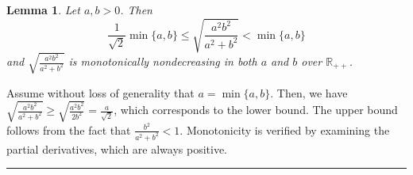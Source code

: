 \documentclass[twoside]{article}
\newcommand{\R}{\mathbb{R}}
\newcommand{\jmlrBlackBox}{\rule{1.5ex}{1.5ex}}
\newcommand{\jmlrQED}{\hfill\jmlrBlackBox\par\bigskip}
\providecommand{\proofname}{Proof}
\renewenvironment{proof}{\par\noindent{\bfseries\upshape \proofname\ }}{\jmlrQED}
\newcommand{\mP}{\mathcal{P}}
\newcommand{\mQ}{\mathcal{Q}}
\newcommand{\verts}[1]{\mathcal{V}_{#1}}
\newcommand{\defi}{\stackrel{\mathrm{\scriptscriptstyle def}}{=}}
\newtheorem{lemma}[theorem]{Lemma}
\begin{document}
%
\begin{lemma}\label{lemma:preparatory_bounds_pw}
Let $a, b > 0$. Then
\begin{equation}
\frac{1}{\sqrt{2}}\min\{a, b\} \le \sqrt{\frac{a^2b^2}{a^2 + b^2}} < \min\{a, b\}
\label{eq:preparatory_bounds_pw}
\end{equation}
and $\sqrt{\frac{a^2b^2}{a^2 + b^2}}$ is monotonically nondecreasing in both $a$ and $b$ over $\R_{++}$.
\end{lemma}
\begin{proof}
Assume without loss of generality that $a = \min \{a, b\}$. 
Then, we have $\sqrt{\frac{a^2b^2}{a^2 + b^2}} \ge \sqrt{\frac{a^2b^2}{2b^2}} = \frac{a}{\sqrt{2}}$, which corresponds to the lower bound. 
The upper bound follows from the fact that $\frac{b^2}{a^2 + b^2} < 1$.
Monotonicity is verified by examining the partial derivatives, which are always positive.
\end{proof}
\end{document}
